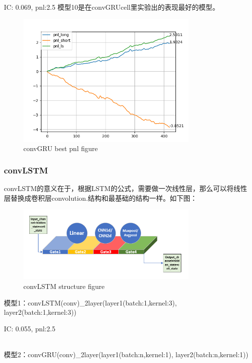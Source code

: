 \documentclass[11pt]{ctexart}
\begin{document}
{\kaishu \small IC: 0.069, pnl:2.5}
模型10是在convGRUcell里实验出的表现最好的模型。
\begin{figure}[H]
\begin{center}
\includegraphics[width=0.8\textwidth]{plt4.PNG}
\end{center}
\caption{convGRU best pnl figure}
\label{FIG.5}
\end{figure}


\subsubsection{convLSTM}
convLSTM的意义在于，根据LSTM的公式，需要做一次线性层，那么可以将线性层替换成卷积层convolution.结构和最基础的结构一样。如下图：
\begin{figure}[H]
\begin{center}
\includegraphics[width=0.8\textwidth]{str1.PNG}
\end{center}
\caption{convLSTM structure figure}
\label{FIG.6}
\end{figure}

模型1：convLSTM(conv)\_2layer(layer1(batch:1,kernel:3), layer2(batch:1,kernel:3))

{\kaishu \small IC: 0.055, pnl:2.5}

~\\
模型2：convGRU(conv)\_2layer(layer1(batch:n,kernel:1), layer2(batch:n,kernel:1))
\end{document}
